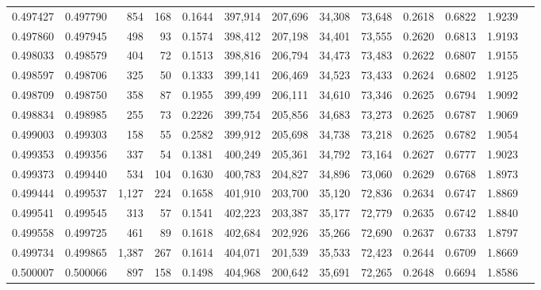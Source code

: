 \begin{tabular}{rrrrrrrrrrrrr}
0.497427 & 0.497790 &   854 &   168 &                                     0.1644 & 397,914 & 207,696 &  34,308 &  73,648 & 0.2618 & 0.6822 & 1.9239 \\
0.497860 & 0.497945 &   498 &    93 &                                     0.1574 & 398,412 & 207,198 &  34,401 &  73,555 & 0.2620 & 0.6813 & 1.9193 \\
0.498033 & 0.498579 &   404 &    72 &                                     0.1513 & 398,816 & 206,794 &  34,473 &  73,483 & 0.2622 & 0.6807 & 1.9155 \\
0.498597 & 0.498706 &   325 &    50 &                                     0.1333 & 399,141 & 206,469 &  34,523 &  73,433 & 0.2624 & 0.6802 & 1.9125 \\
0.498709 & 0.498750 &   358 &    87 &                                     0.1955 & 399,499 & 206,111 &  34,610 &  73,346 & 0.2625 & 0.6794 & 1.9092 \\
0.498834 & 0.498985 &   255 &    73 &                                     0.2226 & 399,754 & 205,856 &  34,683 &  73,273 & 0.2625 & 0.6787 & 1.9069 \\
0.499003 & 0.499303 &   158 &    55 &                                     0.2582 & 399,912 & 205,698 &  34,738 &  73,218 & 0.2625 & 0.6782 & 1.9054 \\
0.499353 & 0.499356 &   337 &    54 &                                     0.1381 & 400,249 & 205,361 &  34,792 &  73,164 & 0.2627 & 0.6777 & 1.9023 \\
0.499373 & 0.499440 &   534 &   104 &                                     0.1630 & 400,783 & 204,827 &  34,896 &  73,060 & 0.2629 & 0.6768 & 1.8973 \\
0.499444 & 0.499537 & 1,127 &   224 &                                     0.1658 & 401,910 & 203,700 &  35,120 &  72,836 & 0.2634 & 0.6747 & 1.8869 \\
0.499541 & 0.499545 &   313 &    57 &                                     0.1541 & 402,223 & 203,387 &  35,177 &  72,779 & 0.2635 & 0.6742 & 1.8840 \\
0.499558 & 0.499725 &   461 &    89 &                                     0.1618 & 402,684 & 202,926 &  35,266 &  72,690 & 0.2637 & 0.6733 & 1.8797 \\
0.499734 & 0.499865 & 1,387 &   267 &                                     0.1614 & 404,071 & 201,539 &  35,533 &  72,423 & 0.2644 & 0.6709 & 1.8669 \\
0.500007 & 0.500066 &   897 &   158 &                                     0.1498 & 404,968 & 200,642 &  35,691 &  72,265 & 0.2648 & 0.6694 & 1.8586 \\

\end{tabular}
